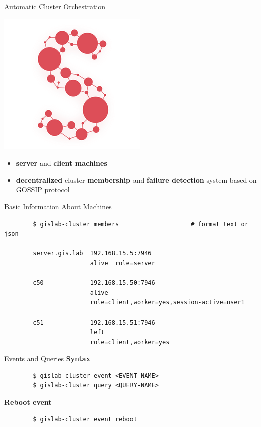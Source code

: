 \documentclass[12pt]{beamer}
\begin{document}
\begin{frame}{Automatic Cluster Orchestration}
	\begin{center}
		\includegraphics[keepaspectratio=true,height=0.5\textheight]{images/serf.png}
	\end{center}
	\begin{itemize}
		\item \textbf{server} and \textbf{client machines}
		\item \textbf{decentralized} cluster \textbf{membership} and \textbf{failure detection} system based on GOSSIP protocol
	\end{itemize}
\end{frame}

\begin{frame}[fragile]{Basic Information About Machines}
	\lstset{language=sh}
	\begin{lstlisting}
		$ gislab-cluster members					# format text or json 

		server.gis.lab  192.168.15.5:7946 
		                alive  role=server

		c50             192.168.15.50:7946
		                alive
		                role=client,worker=yes,session-active=user1

		c51             192.168.15.51:7946
		                left
		                role=client,worker=yes
	\end{lstlisting}
\end{frame}

\begin{frame}[fragile]{Events and Queries}
	\textbf{Syntax}
	\lstset{language=sh}
	\begin{lstlisting}
		$ gislab-cluster event <EVENT-NAME>
		$ gislab-cluster query <QUERY-NAME>		
	\end{lstlisting}

	\textbf{Reboot event}
	\lstset{language=sh}
	\begin{lstlisting}
		$ gislab-cluster event reboot
	\end{lstlisting}
\end{frame}
\end{document}
